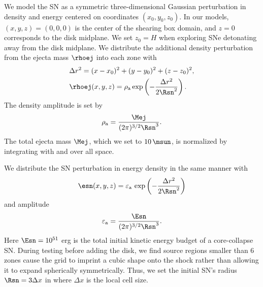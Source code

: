 
We model the SN as a symmetric three-dimensional Gaussian perturbation in density and energy centered on coordinates $(x_0, y_0, z_0)$.
In our models, $(x, y, z) = (0, 0, 0)$ is the center of the shearing box domain, and $z=0$ corresponds to the disk midplane.
We set $z_0=H$ when exploring SNe detonating away from the disk midplane.
We distribute the additional density perturbation from the ejecta mass $\rhoej$ into each zone with
\begin{eqnarray}
    &\Delta r^2 = (x-x_0)^2 + (y-y_0)^2 + (z-z_0)^2, \label{eqn:sn-radius}\\
    &\rhoej (x, y, z) = \rho_{\rm a}\,  {\rm exp}\left(-\frac{\Delta r^2}{2 \Rsn^2}\right). \label{eqn:ejecta-gauss}
\end{eqnarray}
The density amplitude is set by
\begin{equation} \label{eqn:ejecta-amplitude}
    \rho_{\rm a} = \frac{\Mej}{(2 \pi)^{3/2} \Rsn^3}. 
\end{equation}
The total ejecta mass $\Mej$, which we set to $10\,\msun$, is normalized by integrating  with  and  over all space.

We distribute the SN perturbation in energy density in the same manner with
\begin{equation} \label{eqn:energy-gauss}
    \esn (x, y, z) = \varepsilon_{\rm a}\, \exp\left(-\frac{\Delta r^2}{2 \Rsn^2}\right)
\end{equation}
and amplitude
\begin{equation} \label{eqn:energy-amplitude}
    \varepsilon_{\rm a} = \frac{ \Esn }{ (2 \pi)^{3/2} \Rsn^3 }. 
\end{equation}
Here $\Esn = 10^{51}$ erg is the total initial kinetic energy budget of a core-collapse SN.
During testing before adding the disk, we find source regions smaller than 6 zones cause the grid to imprint a cubic shape onto the shock rather than allowing it to expand spherically symmetrically.
Thus, we set the initial SN's radius $\Rsn = 3\Delta x$ in  where $\Delta x$ is the local cell size.

